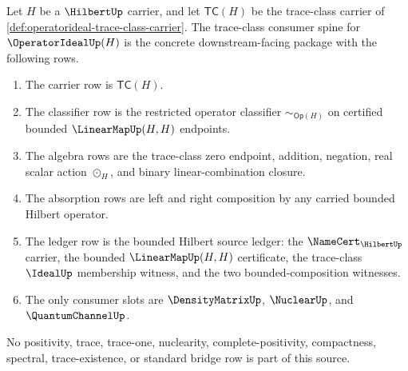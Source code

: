 \begin{definition}
\label{def:operatorideal-trace-class-consumer-spine-source}
Let $H$ be a $\HilbertUp$ carrier, and let $\mathsf{TC}(H)$ be the trace-class carrier of \autoref{def:operatorideal-trace-class-carrier}. The trace-class consumer spine for $\OperatorIdealUp(H)$ is the concrete downstream-facing package with the following rows.
\begin{enumerate}
\item The carrier row is $\mathsf{TC}(H)$.
\item The classifier row is the restricted operator classifier $\sim_{\mathsf{Op}(H)}$ on certified bounded $\LinearMapUp(H,H)$ endpoints.
\item The algebra rows are the trace-class zero endpoint, addition, negation, real scalar action $\odot_H$, and binary linear-combination closure.
\item The absorption rows are left and right composition by any carried bounded Hilbert operator.
\item The ledger row is the bounded Hilbert source ledger: the $\NameCert_{\HilbertUp}$ carrier, the bounded $\LinearMapUp(H,H)$ certificate, the trace-class $\IdealUp$ membership witness, and the two bounded-composition witnesses.
\item The only consumer slots are $\DensityMatrixUp$, $\NuclearUp$, and $\QuantumChannelUp$.
\end{enumerate}
No positivity, trace, trace-one, nuclearity, complete-positivity, compactness, spectral, trace-existence, or standard bridge row is part of this source.
\end{definition}

